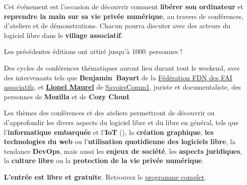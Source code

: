 
\Separateur

Cet événement est l'occasion de découvrir comment \textbf{libérer son ordinateur}
et \textbf{reprendre la main sur sa vie privée numérique},
au travers de conférences, d'ateliers et de démonstrations.
Chacun pourra discuter avec des acteurs du logiciel libre dans le \textbf{village associatif}.

Les précédentes éditions ont attiré jusqu'à \num{1000}~personnes !

\Separateur

Des cycles de conférences thématiques auront lieu durant tout le weekend,
avec des intervenants tels que \textbf{\mbox{Benjamin Bayart}} de la \href{http://ffdn.org/}{Fédération FDN des FAI associatifs},
et \textbf{\href{http://scinfolex.com/}{Lionel Maurel}} de \href{http://savoirscom1.info/}{SavoirsComm1}, juriste et documentaliste,
des personnes de \textbf{Mozilla} et de \textbf{Cozy Cloud}.

\Separateur

Les thèmes des conférences et des ateliers permettront de découvrir ou d'approfondir
les divers aspects du logiciel libre et du libre en général, tels que 
l'\textbf{informatique embarquée} et l'\textbf{IoT} (), la \textbf{création graphique},
\textbf{les technologies du web} ou l'\textbf{utilisation quotidienne des logiciels libre}, la tendance \textbf{DevOps},
mais aussi les \textbf{enjeux de société}, les \textbf{aspects juridiques},
la \textbf{culture libre} ou la \textbf{protection de la vie privée numérique}.

\Separateur

\textbf{L'entrée est libre et gratuite}. Retrouvez le \href{https://2016.capitoledulibre.org/programme.html/}{programme complet}.

